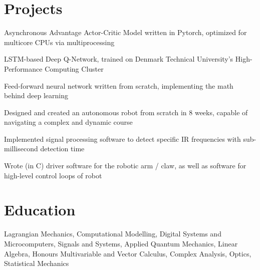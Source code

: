 \documentclass[]{deedy-resume-openfont}
\begin{document}
\vspace{12pt}


\section{Projects}

\begin{tightemize}
    \item Asynchronous Advantage Actor-Critic Model written in Pytorch, optimized for multicore CPUs via multiprocessing
    \item LSTM-based Deep Q-Network, trained on Denmark Technical University's High-Performance Computing Cluster
    \item Feed-forward neural network written from scratch, implementing the math behind deep learning
\end{tightemize}

\vspace{8pt}

\begin{tightemize}
    \item Designed and created an autonomous robot from scratch in 8 weeks, capable of navigating a complex and dynamic course
    \item Implemented signal processing software to detect specific IR frequencies with sub-millisecond detection time
    \item Wrote (in C) driver software for the robotic arm / claw, as well as software for high-level control loops of robot
\end{tightemize}

\vspace{12pt}


\section{Education}

\begin{adjustwidth}{0.55cm}{1.25cm}
   Lagrangian Mechanics, Computational Modelling, Digital Systems and Microcomputers, Signals and Systems, Applied Quantum Mechanics, Linear Algebra, Honours Multivariable and Vector Calculus, Complex Analysis, Optics, Statistical Mechanics
\end{adjustwidth}
\end{document}
